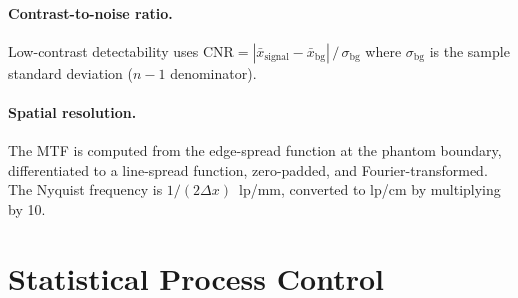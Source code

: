 \documentclass[11pt]{article}
\begin{document}
\paragraph{Contrast-to-noise ratio.}
Low-contrast detectability uses
$\text{CNR} = |\bar{x}_{\text{signal}} - \bar{x}_{\text{bg}}| \,/\, \sigma_{\text{bg}}$
where $\sigma_{\text{bg}}$ is the sample standard deviation ($n{-}1$ denominator).

\paragraph{Spatial resolution.}
The MTF is computed from the edge-spread function at the phantom
boundary, differentiated to a line-spread function, zero-padded,
and Fourier-transformed.
The Nyquist frequency is $1/(2\Delta x)$~lp/mm, converted to
lp/cm by multiplying by 10.


\section{Statistical Process Control}
\label{sec:drift}
\end{document}
